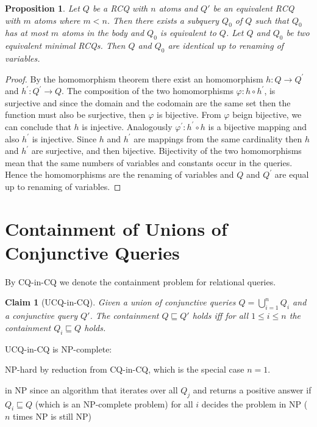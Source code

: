 \documentclass[a4paper,12pt]{article}
\newtheorem{claim}{Claim}
\newtheorem{prop}{Proposition}
\renewcommand{\phi}{\varphi}
\begin{document}
\begin{prop} Let $Q$ be a RCQ with $n$ atoms and $Q'$ be an equivalent RCQ with $m$ atoms where $m < n$. Then there exists a subquery $Q_0$ of $Q$ such that $Q_0$ has at most $m$ atoms in the body and $Q_0$ is equivalent to $Q$.
Let $Q$ and $Q_0$ be two equivalent minimal RCQs. Then $Q$ and $Q_0$
are identical up to renaming of variables.
\end{prop}

\begin{proof}
By the homomorphism theorem there exist an homomorphism $h : Q \rightarrow Q^{'} $ and $h^{'} : Q^{'} \rightarrow Q $. The composition of the two homomorphisms $\phi : h \circ h^{'}$, is surjective and since the domain and the codomain are the same set then the function must also be surjective, then $\phi$ is bijective. From $\phi$ beign bijective, we can conclude that $h$ is injective. Analogously $\phi^{'} : h^{'} \circ h$ is a bijective mapping  and also $h^{'}$ is injective. Since $h$ and $h^{'}$ are  mappings from the same cardinality then $h$ and $h^{'}$ are surjective, and then bijective. Bijectivity of the two homomorphisms mean that the same numbers of variables and constants occur in the queries. Hence the homomorphisms are the renaming of variables and $Q$ and $Q^{'}$ are equal up to renaming of variables.


\end{proof}

\section{Containment of Unions of Conjunctive Queries}

By CQ-in-CQ we denote the containment problem for relational queries.

\begin{claim}[UCQ-in-CQ]
Given a union of conjunctive queries $Q = \bigcup_{i=1}^n Q_i$ and a conjunctive query $Q'$. The containment $Q \sqsubseteq Q'$ holds iff for all $1 \leq i \leq n$ the containment $Q_i \sqsubseteq Q$ holds.
\end{claim}

UCQ-in-CQ is NP-complete:

\begin{description}
\item{NP-hard} by reduction from CQ-in-CQ, which is the special case $n = 1$.
\item{in NP} since an algorithm that iterates over all $Q_j$ and returns a positive answer if $Q_i \sqsubseteq Q$ (which is an NP-complete problem) for all $i$ decides the problem in NP ($n$ times NP is still NP)
\end{description}
\end{document}
